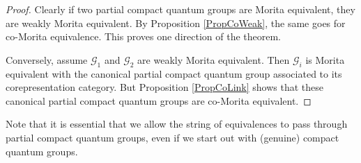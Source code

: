 \begin{proof} Clearly if two partial compact quantum groups are Morita equivalent, they are weakly Morita equivalent. By Proposition \ref{PropCoWeak}, the same goes for co-Morita equivalence. This proves one direction of the theorem. 

Conversely, assume $\mathscr{G}_1$ and $\mathscr{G}_2$ are weakly Morita equivalent. Then $\mathscr{G}_i$ is Morita equivalent with the canonical partial compact quantum group associated to its corepresentation category. But Proposition \ref{PropCoLink} shows that these canonical partial compact quantum groups are co-Morita equivalent. 
\end{proof} 

\begin{Rem} Note that it is essential that we allow the string of equivalences to pass through partial compact quantum groups, even if we start out with (genuine) compact quantum groups.\end{Rem}






